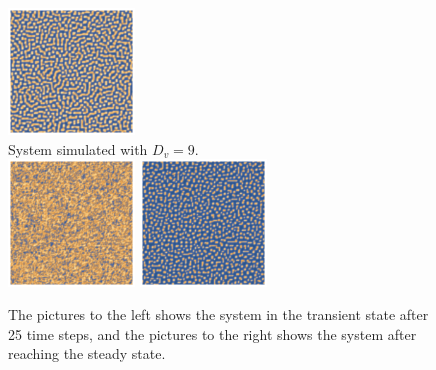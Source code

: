 \begin{figure}[h]
    \includegraphics[width=0.3\textwidth]{img/2bd5.png}\\
    System simulated with $D_v=9$.\\
    \includegraphics[width=0.3\textwidth]{img/2bd9transient.png}
    \includegraphics[width=0.3\textwidth]{img/2bd9.png}
  \caption{The pictures to the left shows the system in the transient state after 25 time steps, and the pictures to the right shows the system after reaching the steady state.}
\end{figure}
